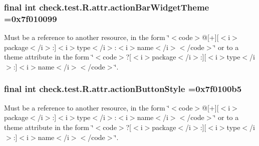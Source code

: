 \subsubsection[{action\+Bar\+Widget\+Theme}]{\setlength{\rightskip}{0pt plus 5cm}final int check.\+test.\+R.\+attr.\+action\+Bar\+Widget\+Theme =0x7f010099\hspace{0.3cm}{\ttfamily [static]}}\label{classcheck_1_1test_1_1_r_1_1attr_abfe49028f89a795ded936ee9dc2a850b}
Must be a reference to another resource, in the form \char`\"{}$<$code$>$@\mbox{[}+\mbox{]}\mbox{[}$<$i$>$package$<$/i$>$\+:\mbox{]}$<$i$>$type$<$/i$>$\+:$<$i$>$name$<$/i$>$$<$/code$>$\char`\"{} or to a theme attribute in the form \char`\"{}$<$code$>$?\mbox{[}$<$i$>$package$<$/i$>$\+:\mbox{]}\mbox{[}$<$i$>$type$<$/i$>$\+:\mbox{]}$<$i$>$name$<$/i$>$$<$/code$>$\char`\"{}. \hypertarget{classcheck_1_1test_1_1_r_1_1attr_a3fc78aabb5334c90119bc8f0800b05c3}{}
\subsubsection[{action\+Button\+Style}]{\setlength{\rightskip}{0pt plus 5cm}final int check.\+test.\+R.\+attr.\+action\+Button\+Style =0x7f0100b5\hspace{0.3cm}{\ttfamily [static]}}\label{classcheck_1_1test_1_1_r_1_1attr_a3fc78aabb5334c90119bc8f0800b05c3}
Must be a reference to another resource, in the form \char`\"{}$<$code$>$@\mbox{[}+\mbox{]}\mbox{[}$<$i$>$package$<$/i$>$\+:\mbox{]}$<$i$>$type$<$/i$>$\+:$<$i$>$name$<$/i$>$$<$/code$>$\char`\"{} or to a theme attribute in the form \char`\"{}$<$code$>$?\mbox{[}$<$i$>$package$<$/i$>$\+:\mbox{]}\mbox{[}$<$i$>$type$<$/i$>$\+:\mbox{]}$<$i$>$name$<$/i$>$$<$/code$>$\char`\"{}. \hypertarget{classcheck_1_1test_1_1_r_1_1attr_a45269834542ea70d42dc68393312c539}{}
